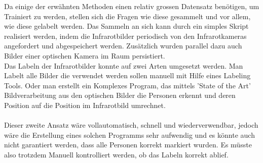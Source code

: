 Da einige der erwähnten Methoden einen relativ grossen Datensatz benötigen, um Trainiert zu werden, stellen sich die Fragen wie diese gesammelt und vor allem, wie diese gelabelt werden. Das Sammeln an sich kann durch ein simples Skript realisiert werden, indem die Infrarotbilder periodisch von den Infrarotkameras angefordert und abgespeichert werden. Zusätzlich wurden parallel dazu auch Bilder einer optischen Kamera im Raum persistiert.\\
Das Labeln der Infrarotbilder konnte auf zwei Arten umgesetzt werden. Man Labelt alle Bilder die verwendet werden sollen manuell mit Hilfe eines Labeling Tools. Oder man erstellt ein Komplexes Program, das mittels 'State of the Art' Bildverarbeitung aus den optischen Bilder die Personen erkennt und deren Position auf die Position im Infrarotbild umrechnet.\\
\\
Dieser zweite Ansatz wäre vollautomatisch, schnell und wiederverwendbar, jedoch wäre die Erstellung eines solchen Programms sehr aufwendig und es könnte auch nicht garantiert werden, dass alle Personen korrekt markiert wurden. Es müsste also trotzdem Manuell kontrolliert werden, ob das Labeln korrekt ablief. 

